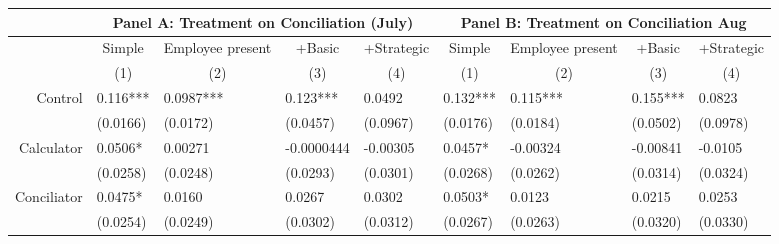\begin{tabular}{rrrrrrrrr}
\toprule
      & \multicolumn{4}{c}{Panel A: Treatment on Conciliation (July)} & \multicolumn{4}{c}{Panel B: Treatment on Conciliation Aug} \\
\midrule
      & \multicolumn{1}{c}{Simple} & \multicolumn{1}{c}{Employee present} & \multicolumn{1}{c}{+Basic} & \multicolumn{1}{c}{+Strategic} & \multicolumn{1}{c}{Simple} & \multicolumn{1}{c}{Employee present} & \multicolumn{1}{c}{+Basic} & \multicolumn{1}{c}{+Strategic} \\
      & \multicolumn{1}{c}{(1)} & \multicolumn{1}{c}{(2)} & \multicolumn{1}{c}{(3)} & \multicolumn{1}{c}{(4)} & \multicolumn{1}{c}{(1)} & \multicolumn{1}{c}{(2)} & \multicolumn{1}{c}{(3)} & \multicolumn{1}{c}{(4)} \\
            \midrule
      \midrule
Control & \multicolumn{1}{l}{0.116***} & \multicolumn{1}{l}{0.0987***} & \multicolumn{1}{l}{0.123***} & \multicolumn{1}{l}{0.0492} & \multicolumn{1}{l}{0.132***} & \multicolumn{1}{l}{0.115***} & \multicolumn{1}{l}{0.155***} & \multicolumn{1}{l}{0.0823} \\
      & \multicolumn{1}{l}{(0.0166)} & \multicolumn{1}{l}{(0.0172)} & \multicolumn{1}{l}{(0.0457)} & \multicolumn{1}{l}{(0.0967)} & \multicolumn{1}{l}{(0.0176)} & \multicolumn{1}{l}{(0.0184)} & \multicolumn{1}{l}{(0.0502)} & \multicolumn{1}{l}{(0.0978)} \\
Calculator & \multicolumn{1}{l}{0.0506*} & \multicolumn{1}{l}{0.00271} & \multicolumn{1}{l}{-0.0000444} & \multicolumn{1}{l}{-0.00305} & \multicolumn{1}{l}{0.0457*} & \multicolumn{1}{l}{-0.00324} & \multicolumn{1}{l}{-0.00841} & \multicolumn{1}{l}{-0.0105} \\
      & \multicolumn{1}{l}{(0.0258)} & \multicolumn{1}{l}{(0.0248)} & \multicolumn{1}{l}{(0.0293)} & \multicolumn{1}{l}{(0.0301)} & \multicolumn{1}{l}{(0.0268)} & \multicolumn{1}{l}{(0.0262)} & \multicolumn{1}{l}{(0.0314)} & \multicolumn{1}{l}{(0.0324)} \\
Conciliator & \multicolumn{1}{l}{0.0475*} & \multicolumn{1}{l}{0.0160} & \multicolumn{1}{l}{0.0267} & \multicolumn{1}{l}{0.0302} & \multicolumn{1}{l}{0.0503*} & \multicolumn{1}{l}{0.0123} & \multicolumn{1}{l}{0.0215} & \multicolumn{1}{l}{0.0253} \\
      & \multicolumn{1}{l}{(0.0254)} & \multicolumn{1}{l}{(0.0249)} & \multicolumn{1}{l}{(0.0302)} & \multicolumn{1}{l}{(0.0312)} & \multicolumn{1}{l}{(0.0267)} & \multicolumn{1}{l}{(0.0263)} & \multicolumn{1}{l}{(0.0320)} & \multicolumn{1}{l}{(0.0330)} \\

\end{tabular}
